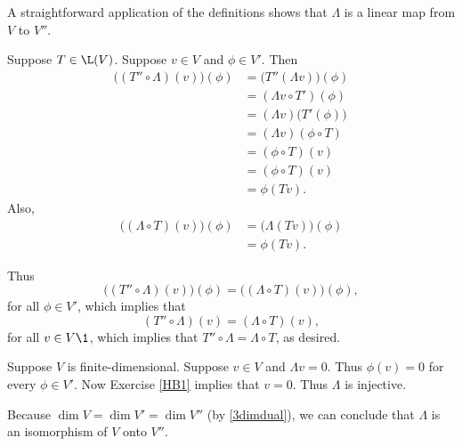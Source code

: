 \begin{Solution}
\begin{subtheorem}
\item
A straightforward application of the definitions shows that $\Lambda$ is a linear map from $V$ to $V''\!$.

\item
Suppose $T \in \L(V)$. Suppose $v \in V$ and $\phi \in V'\!$. Then
\begin{align*}
\bigl((T'' \circ \Lambda)(v) \bigr)(\phi) &= \bigl(T'' \! (\Lambda v)\bigr)(\phi) \\
&= ( \Lambda v \circ T')(\phi) \\
&= (\Lambda v) \bigl( T' \! (\phi) \bigr)\\
&= (\Lambda v)(\phi \circ T)\\
&= (\phi \circ T)(v) \\
&= (\phi \circ T)(v) \\
&= \phi(Tv).
\end{align*}
Also,
\begin{align*}
\bigl((\Lambda \circ T)(v)\bigr) (\phi) &= \bigl( \Lambda(Tv) \bigr)(\phi) \\
&= \phi(Tv).
\end{align*}

Thus
\[
\bigl((T'' \circ \Lambda)(v) \bigr)(\phi) = \bigl((\Lambda \circ T)(v)\bigr) (\phi),
\]
for all $\phi \in V'\!$, which implies that
\[
(T'' \circ \Lambda)(v) = (\Lambda \circ T)(v),
\]
for all $v \in V\1$, which implies that $T'' \circ \Lambda = \Lambda \circ T$, as desired.

\item
Suppose $V$ is finite-dimensional. Suppose $v \in V$ and $\Lambda v = 0$. Thus $\phi(v) = 0$ for every $\phi \in V'\!$. Now Exercise \ref{HB1} implies that $v = 0$. Thus $\Lambda$ is injective.

Because $\dim V = \dim V' = \dim V''$ (by \ref{3dimdual}), we can conclude that $\Lambda$ is an isomorphism of $V$ onto $V''\!$.
\end{subtheorem}
\end{Solution}

